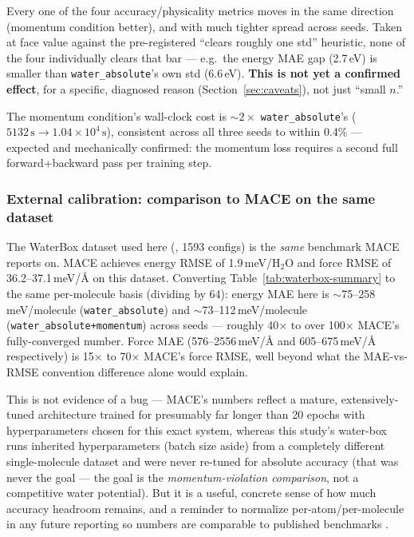 \documentclass[11pt]{article}
\begin{document}
Every one of the four accuracy/physicality metrics moves in the same
direction (momentum condition better), and with much tighter spread across
seeds. Taken at face value against the pre-registered ``clears roughly one
std'' heuristic, none of the four individually clears that bar --- e.g.\ the
energy MAE gap (2.7\,eV) is smaller than \texttt{water\_absolute}'s own std
(6.6\,eV). \textbf{This is not yet a confirmed effect}, for a specific,
diagnosed reason (Section~\ref{sec:caveats}), not just ``small $n$.''

The momentum condition's wall-clock cost is $\sim2\times$
\texttt{water\_absolute}'s ($5132\,\mathrm{s} \to 1.04{\times}10^4\,
\mathrm{s}$), consistent across all three seeds to within 0.4\% --- expected
and mechanically confirmed: the momentum loss requires a second full
forward+backward pass per training step.

\subsubsection{External calibration: comparison to MACE on the same dataset}

The WaterBox dataset used here (\citet{cheng2019water}, 1593 configs) is the
\emph{same} benchmark MACE \cite{mace} reports on. MACE achieves energy RMSE
of 1.9\,meV/H$_2$O and force RMSE of 36.2--37.1\,meV/\AA{} on this dataset.
Converting Table~\ref{tab:waterbox-summary} to the same per-molecule basis
(dividing by 64): energy MAE here is $\sim$75--258\,meV/molecule
(\texttt{water\_absolute}) and $\sim$73--112\,meV/molecule
(\texttt{water\_absolute+momentum}) across seeds --- roughly 40$\times$ to
over 100$\times$ MACE's fully-converged number. Force MAE
(576--2556\,meV/\AA{} and 605--675\,meV/\AA{} respectively) is 15$\times$ to
70$\times$ MACE's force RMSE, well beyond what the MAE-vs-RMSE convention
difference alone would explain.

This is not evidence of a bug --- MACE's numbers reflect a mature,
extensively-tuned architecture trained for presumably far longer than 20
epochs with hyperparameters chosen for this exact system, whereas this
study's water-box runs inherited hyperparameters (batch size aside) from a
completely different single-molecule dataset and were never re-tuned for
absolute accuracy (that was never the goal --- the goal is the
\emph{momentum-violation comparison}, not a competitive water potential).
But it is a useful, concrete sense of how much accuracy headroom remains,
and a reminder to normalize per-atom/per-molecule in any future reporting
so numbers are comparable to published benchmarks
\cite{mlip-error-metrics, mlip-validation}.
\end{document}
